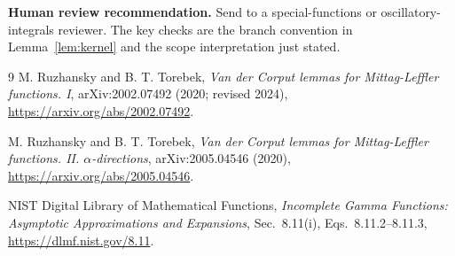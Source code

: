\documentclass[11pt]{article}
\begin{document}
\textbf{Human review recommendation.} Send to a special-functions or
oscillatory-integrals reviewer. The key checks are the branch convention in
Lemma~\ref{lem:kernel} and the scope interpretation just stated.

\begin{thebibliography}{9}
M. Ruzhansky and B. T. Torebek,
\emph{Van der Corput lemmas for Mittag-Leffler functions. I},
arXiv:2002.07492 (2020; revised 2024),
\url{https://arxiv.org/abs/2002.07492}.

M. Ruzhansky and B. T. Torebek,
\emph{Van der Corput lemmas for Mittag-Leffler functions. II.
$\alpha$-directions},
arXiv:2005.04546 (2020),
\url{https://arxiv.org/abs/2005.04546}.

NIST Digital Library of Mathematical Functions,
\emph{Incomplete Gamma Functions: Asymptotic Approximations and Expansions},
Sec.~8.11(i), Eqs.~8.11.2--8.11.3,
\url{https://dlmf.nist.gov/8.11}.
\end{thebibliography}
\end{document}
